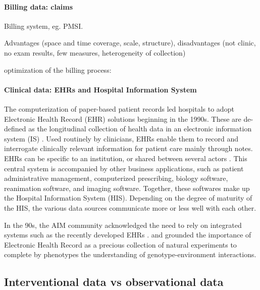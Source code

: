 \documentclass[french,12pt,twoside,a4paper]{book}
\begin{document}
\begin{background_box_left}
  \paragraph{Billing data: claims}

  Billing system, eg. PMSI.

  Advantages (space and time coverage, scale, structure), disadvantages (not
  clinic, no exam results, few measures, heterogeneity of collection)

  optimization of the billing process: \citep{juven2013codage}




  \paragraph{Clinical data: EHRs and Hospital Information System}\label{def:ehr_his}

  The computerization of paper-based patient records led hospitals to adopt
  Electronic Health Record (EHR) solutions beginning in the 1990s. These are de-
  defined as the longitudinal collection of health data in an electronic
  information system (IS) \citep{gunter2005emergence}. Used routinely by
  clinicians, EHRs enable them to record and interrogate clinically relevant
  information for patient care mainly through notes. EHRs can be specific to an
  institution, or shared between several actors \citep{hoerbst2010electronic}.
  This central system is accompanied by other business applications, such as
  patient administrative management, computerized prescribing, biology software,
  reanimation software, and imaging software. Together, these softwares make up
  the Hospital Information System (HIS). Depending on the degree of maturity of
  the HIS, the various data sources communicate more or less well with each other.

  In the 90s, the AIM community acknowledged the need to rely on integrated
  systems such as the recently developed EHRs \citep{patel2009coming}.
  \cite{patel2009coming} and \cite{butte2006creation} grounded the importance of
  Electronic Health Record as a precious collection of natural experiments to
  complete by phenotypes the understanding of genotype-environment interactions.

  \subsection{Interventional data vs observational
    data}\label{subsec:intro:interventional_vs_observational}



\end{background_box_left}
\end{document}
